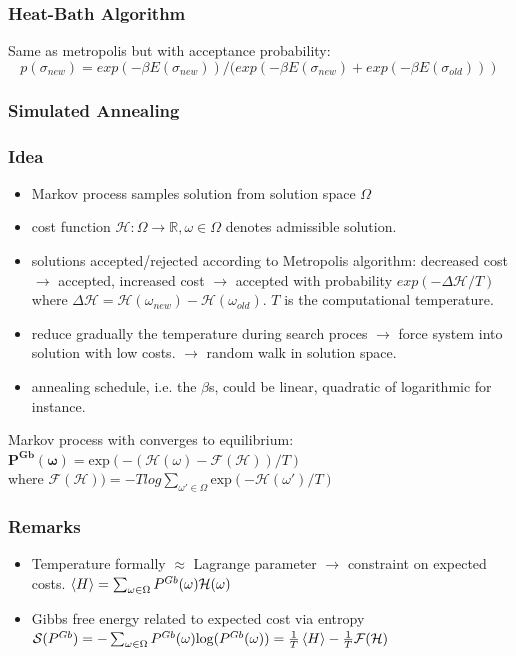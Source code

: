 \documentclass[9pt,parskip]{scrartcl}
\begin{document}
\begin{multicols*}{4}
\subsubsection*{Heat-Bath Algorithm}
Same as metropolis but with acceptance probability:
$$p(\sigma_{new}) = exp(-\beta E(\sigma_{new})) / ( exp(-\beta E(\sigma_{new}) + exp(-\beta E(\sigma_{old})))$$

\subsubsection*{Simulated Annealing}
\subsubsection*{Idea}
\begin{itemize}
	\item Markov process samples solution from solution space $\Omega$
	\item cost function $\mathcal{H}: \Omega \to \mathbb{R}, \omega \in \Omega$ denotes admissible solution.
	\item solutions accepted/rejected according to Metropolis algorithm: decreased cost $\to$ accepted, increased cost $\to$ accepted with probability $exp(- \Delta \mathcal{H}/T)$ where $\Delta \mathcal{H} = \mathcal{H}(\omega_{new}) - \mathcal{H}(\omega_{old}) $. $T$ is the computational temperature.
	\item reduce gradually the temperature during search proces $\to$ force system into solution with low costs. $\to$ random walk in solution space.
	\item annealing schedule, i.e. the $\beta$s, could be linear, quadratic of logarithmic for instance.

\end{itemize}
Markov process with converges to equilibrium: \\
$\mathbf{P^{Gb}(\omega)} = \text{exp}(-(\mathcal{H}(\omega) - \mathcal{F}(\mathcal{H}))/T )$ \\
where $\mathcal{F}(\mathcal{H})) = -T log \sum_{\omega' \in \Omega} \text{exp}(-\mathcal{H}(\omega')/T )$
\subsubsection*{Remarks}
\begin{itemize}
	\item Temperature formally $\approx$ Lagrange parameter $\to$ constraint on expected costs. $\braket{H} = \sum_{\omega \in \Omega} P^{Gb}(\omega)  \mathcal{H}(\omega)$
	\item Gibbs free energy related to expected cost via entropy $\mathcal{S}(P^{Gb}) = -\sum_{\omega \in \Omega} P^{Gb}(\omega)  \text{log} (P^{Gb}(\omega) ) = \frac 1 T \braket{H} - \frac 1 T \mathcal{F}(\mathcal{H})$
\end{itemize}


\end{multicols*}
\end{document}
